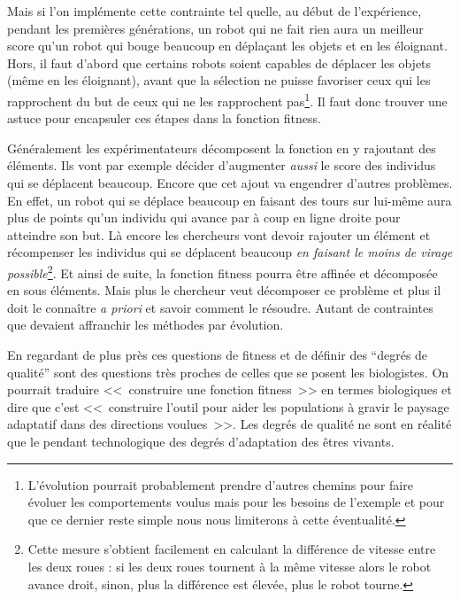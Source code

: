 Mais si l'on implémente cette contrainte tel quelle, au début de l'expérience, pendant les premières générations, un robot qui ne fait rien aura un meilleur score qu'un robot qui bouge beaucoup en déplaçant les objets et en les éloignant. Hors, il faut d'abord que certains robots soient capables de déplacer les objets (même en les éloignant), avant que la sélection ne puisse favoriser ceux qui les rapprochent du but de ceux qui ne les rapprochent pas\footnote{L'évolution pourrait probablement prendre d'autres chemins pour faire évoluer les comportements voulus mais pour les besoins de l'exemple et pour que ce dernier reste simple nous nous limiterons à cette éventualité.}. Il faut donc trouver une astuce pour encapsuler ces étapes dans la fonction fitness.

Généralement les expérimentateurs décomposent la fonction en y rajoutant des éléments. Ils vont par exemple décider d'augmenter \emph{aussi} le score des individus qui se déplacent beaucoup. Encore que cet ajout va engendrer d'autres problèmes. En effet, un robot qui se déplace beaucoup en faisant des tours sur lui-même aura plus de points qu'un individu qui avance par à coup en ligne droite pour atteindre son but. Là encore les chercheurs vont devoir rajouter un élément et récompenser les individus qui se déplacent beaucoup \emph{en faisant le moins de virage possible}\footnote{Cette mesure s'obtient facilement en calculant la différence de vitesse entre les deux roues : si les deux roues tournent à la même vitesse alors le robot avance droit, sinon, plus la différence est élevée, plus le robot tourne.}. Et ainsi de suite, la fonction fitness pourra être affinée et décomposée en sous éléments. Mais plus le chercheur veut décomposer ce problème et plus il doit le connaître \emph{a priori} et savoir comment le résoudre. Autant de contraintes que devaient affranchir les méthodes par évolution.

En regardant de plus près ces questions de fitness et de définir des ``degrés de qualité'' sont des questions très proches de celles que se posent les biologistes.
On pourrait traduire <<~construire une fonction fitness~>> en termes biologiques et dire que c'est <<~construire l'outil pour aider les populations à gravir le paysage adaptatif dans des directions voulues~>>. Les degrés de qualité ne sont en réalité que le pendant technologique des degrés d'adaptation des êtres vivants.


